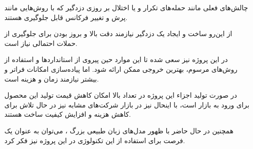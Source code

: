 \documentclass[a4paper,12pt]{report}
\begin{document}
	چالش‌های فعلی مانند حمله‌های تکرار و یا اختلال بر روزی دزدگیر که با روش‌هایی مانند پرش و تغییر فرکانس قابل جلوگیری هستند.

	از این‌رو ساخت و ایجاد یک دزدگیر نیازمند دقت بالا و بروز بودن برای جلوگیری از حملات احتمالی نیاز است.

	در این پروژه نیز سعی شده تا این موارد حین پیروی از استانداردها و استفاده از روش‌های مرسوم،  بهترین خروجی ممکن ارائه شود.
	اما پیاده‌سازی امکانات فراتر و بیشتر نیازمند زمان و هزینه است.

	در صورت تولید اجزاء این پروژه در تعداد بالا امکان کاهش قیمت تولید این محصول برای ورود به بازار است، با اینحال نیز در بازار شرکت‌های مشابه نیز در حال تلاش برای کاهش هزینه و افزایش کیفیت ساخت هستند.

	همچنین در حال حاضر با ظهور مدل‌های زبان طبیعی بزرگ ، می‌توان به عنوان یک فرصت برای استفاده از این تکنولوژی در این پروژه نیز فکر کرد.
%
%
%
%
%
\end{document}
